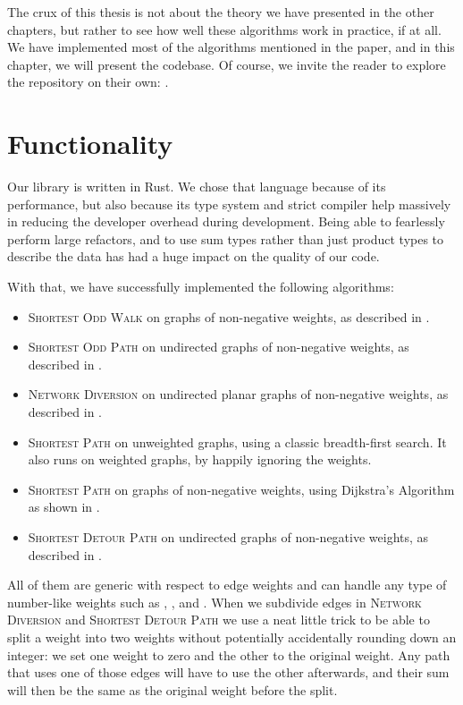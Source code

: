 The crux of this thesis is not about the theory we have presented in the other chapters, but rather to see how well these algorithms work in practice, if at all. We have implemented most of the algorithms mentioned in the paper, and in this chapter, we will present the codebase. Of course, we invite the reader to explore the repository on their own: \cite{source:codebase}.

\section{Functionality}
Our library is written in Rust. We chose that language because of its performance, but also because its type system and strict compiler help massively in reducing the developer overhead during development. Being able to fearlessly perform large refactors, and to use sum types rather than just product types to describe the data has had a huge impact on the quality of our code.

With that, we have successfully implemented the following algorithms:

\begin{itemize}
    \item \textsc{Shortest Odd Walk} on graphs of non-negative weights, as described in .
    \item \textsc{Shortest Odd Path} on undirected graphs of non-negative weights, as described in .
    \item \textsc{Network Diversion} on undirected planar graphs of non-negative weights, as described in .
    \item \textsc{Shortest Path} on unweighted graphs, using a classic breadth-first search. It also runs on weighted graphs, by happily ignoring the weights.
    \item \textsc{Shortest Path} on graphs of non-negative weights, using Dijkstra's Algorithm as shown in .
    \item \textsc{Shortest Detour Path} on undirected graphs of non-negative weights, as described in .
\end{itemize}

All of them are generic with respect to edge weights and can handle any type of number-like weights such as , , and . When we subdivide edges in \textsc{Network Diversion} and \textsc{Shortest Detour Path} we use a neat little trick to be able to split a weight into two weights without potentially accidentally rounding down an integer: we set one weight to zero and the other to the original weight. Any path that uses one of those edges will have to use the other afterwards, and their sum will then be the same as the original weight before the split.
